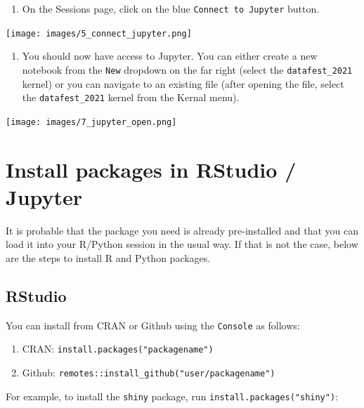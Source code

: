 \documentclass[]{book}
\providecommand{\tightlist}{%
  \setlength{\itemsep}{0pt}\setlength{\parskip}{0pt}}
\begin{document}
\begin{enumerate}
\def\labelenumi{\arabic{enumi}.}
\setcounter{enumi}{3}
\tightlist
\item
  On the Sessions page, click on the blue \texttt{Connect\ to\ Jupyter} button.
\end{enumerate}

\texttt{[image: images/5\_connect\_jupyter.png]}

\begin{enumerate}
\def\labelenumi{\arabic{enumi}.}
\setcounter{enumi}{4}
\tightlist
\item
  You should now have access to Jupyter. You can either create a new notebook from the \texttt{New} dropdown on the far right (select the \texttt{datafest\_2021} kernel) or you can navigate to an existing file (after opening the file, select the \texttt{datafest\_2021} kernel from the Kernal menu).
\end{enumerate}

\texttt{[image: images/7\_jupyter\_open.png]}

\hypertarget{install-packages-in-rstudio-jupyter}{%
\chapter*{Install packages in RStudio / Jupyter}\label{install-packages-in-rstudio-jupyter}}

It is probable that the package you need is already pre-installed and that you can load it into your R/Python session in the usual way. If that is not the case, below are the steps to install R and Python packages.

\hypertarget{rstudio-1}{%
\section{RStudio}\label{rstudio-1}}

You can install from CRAN or Github using the \texttt{Console} as follows:

\begin{enumerate}
\def\labelenumi{\arabic{enumi}.}
\tightlist
\item
  CRAN: \texttt{install.packages("packagename")}
\item
  Github: \texttt{remotes::install\_github("user/packagename")}
\end{enumerate}

For example, to install the \texttt{shiny} package, run \texttt{install.packages("shiny")}:
\end{document}
